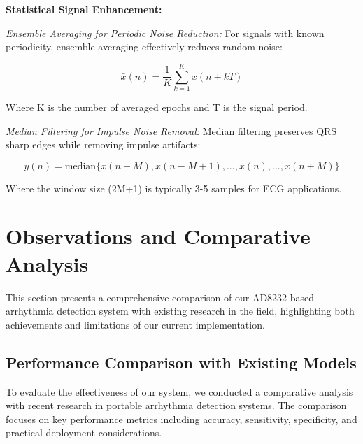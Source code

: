 \documentclass[12pt,a4paper]{article}
\begin{document}
\vspace{0.5cm}

\textbf{Statistical Signal Enhancement:}

\textit{Ensemble Averaging for Periodic Noise Reduction:}
For signals with known periodicity, ensemble averaging effectively reduces random noise:

\begin{equation*}
\bar{x}(n) = \frac{1}{K} \sum_{k=1}^{K} x(n + kT)
\end{equation*}

Where K is the number of averaged epochs and T is the signal period.

\textit{Median Filtering for Impulse Noise Removal:}
Median filtering preserves QRS sharp edges while removing impulse artifacts:

\begin{equation*}
y(n) = \text{median}\{x(n-M), x(n-M+1), ..., x(n), ..., x(n+M)\}
\end{equation*}

Where the window size (2M+1) is typically 3-5 samples for ECG applications.

\section{Observations and Comparative Analysis}

This section presents a comprehensive comparison of our AD8232-based arrhythmia detection system with existing research in the field, highlighting both achievements and limitations of our current implementation.

\subsection{Performance Comparison with Existing Models}

To evaluate the effectiveness of our system, we conducted a comparative analysis with recent research in portable arrhythmia detection systems. The comparison focuses on key performance metrics including accuracy, sensitivity, specificity, and practical deployment considerations.
\end{document}

